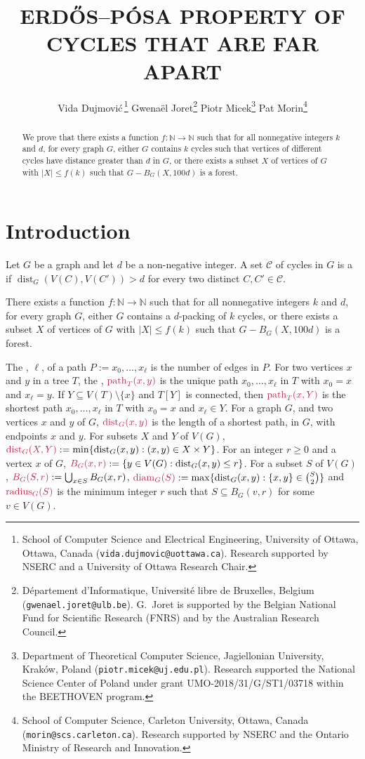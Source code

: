 \documentclass{patmorin}
\title{\MakeUppercase{{E}rdős–{P}ósa property of cycles that are far apart}}
\author{
 Vida Dujmovi{\'c}\,\footnote{School of Computer Science and Electrical Engineering, University of Ottawa, Ottawa, Canada (\texttt{vida.dujmovic@uottawa.ca}). Research supported by NSERC and a University of Ottawa Research Chair.}
 \qquad
 Gwena\"el Joret\footnote{D\'epartement d'Informatique, Universit\'e libre de Bruxelles, Belgium ({\tt gwenael.joret@ulb.be}). G.\ Joret is supported by the Belgian National Fund for Scientific Research (FNRS) and by the Australian Research Council.}
 \qquad
 Piotr Micek\footnote{Department of Theoretical Computer Science, Jagiellonian University, Kraków, Poland (\texttt{piotr.micek@uj.edu.pl}). Research supported
 the National Science Center of Poland under grant UMO-2018/31/G/ST1/03718 within the BEETHOVEN program.}
 \qquad
 Pat Morin\footnote{School of Computer Science, Carleton University, Ottawa, Canada (\texttt{morin@scs.carleton.ca}). Research supported by NSERC and the Ontario Ministry of Research and Innovation.}}
\date{}
\DeclareMathOperator{\diam}{diam}
\DeclareMathOperator{\radius}{radius}
\DeclareMathOperator{\pth}{path}
\DeclareMathOperator{\dist}{dist}
\begin{document}
\maketitle

\begin{abstract}
  We prove that there exists a function $f:\mathbb{N}\to\mathbb{N}$ such that for all nonnegative integers $k$ and $d$,  for every graph $G$,  either $G$ contains $k$ cycles such that vertices of different cycles have distance greater than $d$ in $G$, or there exists a subset $X$ of vertices of $G$ with $|X|\leq f(k)$ such that  $G-B_G(X,100d)$ is a forest.
\end{abstract}

\section{Introduction}

Let $G$ be a graph and let $d$ be a non-negative integer.
A set $\mathcal{C}$ of cycles in $G$ is a  if $\dist_G(V(C),V(C'))> d$ for every two distinct $C,C'\in\mathcal{C}$.

\begin{thm}\label{thm:main-in-intro}
  There exists a function $f:\mathbb{N}\to\mathbb{N}$ such that for all nonnegative integers $k$ and $d$,  for every graph $G$,  either $G$ contains a $d$-packing of $k$ cycles, or  there exists a subset $X$ of vertices of $G$ with $|X|\leq f(k)$ such that  $G-B_G(X,100d)$ is a forest.
\end{thm}


The , $\ell$, of a path $P:=x_0,\ldots,x_\ell$ is the number of edges in $P$.  For two vertices $x$ and $y$ in a  tree $T$, the , $\mathdefin{\pth_T(x,y)}$ is the unique path $x_0,\ldots,x_\ell$ in $T$ with $x_0=x$ and $x_\ell=y$. If $Y\subseteq V(T)\setminus\{x\}$ and $T[Y]$ is connected, then $\mathdefin{\pth_T(x,Y)}$ is the shortest path $x_0,\ldots,x_{\ell}$ in $T$ with $x_0=x$ and $x_\ell\in Y$.  For a graph $G$, and two vertices $x$ and $y$ of $G$, $\mathdefin{\dist_G(x,y)}$ is the length of a shortest path, in $G$, with endpoints $x$ and $y$.  For subsets $X$ and $Y$ of $V(G)$, $\mathdefin{\dist_G(X,Y)}:=\min\{\dist_G(x,y):(x,y)\in X\times Y\}$.  For an integer $r\ge 0$ and a vertex $x$ of $G$, $\mathdefin{B_G(x,r)}:=\{y\in V(G):\dist_G(x,y)\le r\}$.  For a subset $S$ of $V(G)$, $\mathdefin{B_G(S,r)}:=\bigcup_{x\in S}B_G(x,r)$, $\mathdefin{\diam_G(S)}:=\max\{\dist_G(x,y):\{x,y\}\in\binom{S}{2}\}$ and $\mathdefin{\radius_G(S)}$ is the minimum integer $r$ such that $S\subseteq B_G(v,r)$ for some $v\in V(G)$.
\end{document}
